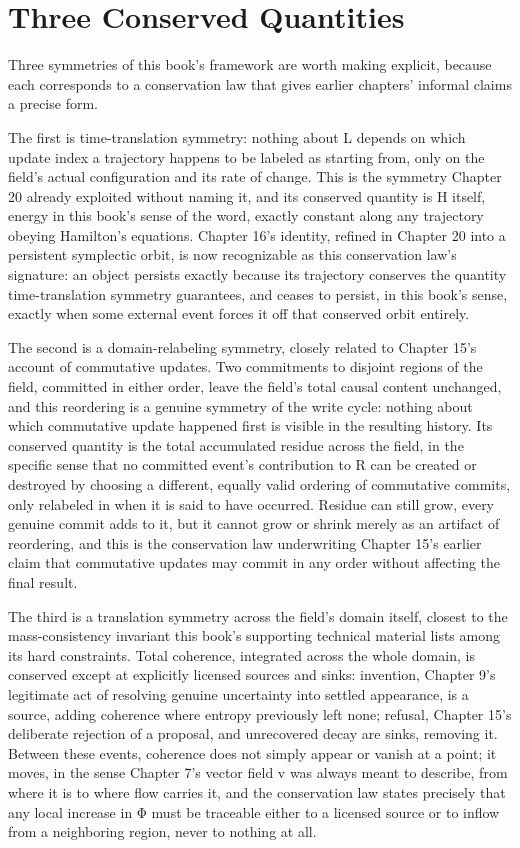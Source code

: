 \section{Three Conserved Quantities}

Three symmetries of this book's framework are worth making explicit, because each corresponds to a conservation law that gives earlier chapters' informal claims a precise form.

The first is time-translation symmetry: nothing about L depends on which update index a trajectory happens to be labeled as starting from, only on the field's actual configuration and its rate of change. This is the symmetry Chapter 20 already exploited without naming it, and its conserved quantity is H itself, energy in this book's sense of the word, exactly constant along any trajectory obeying Hamilton's equations. Chapter 16's identity, refined in Chapter 20 into a persistent symplectic orbit, is now recognizable as this conservation law's signature: an object persists exactly because its trajectory conserves the quantity time-translation symmetry guarantees, and ceases to persist, in this book's sense, exactly when some external event forces it off that conserved orbit entirely.

The second is a domain-relabeling symmetry, closely related to Chapter 15's account of commutative updates. Two commitments to disjoint regions of the field, committed in either order, leave the field's total causal content unchanged, and this reordering is a genuine symmetry of the write cycle: nothing about which commutative update happened first is visible in the resulting history. Its conserved quantity is the total accumulated residue across the field, in the specific sense that no committed event's contribution to R can be created or destroyed by choosing a different, equally valid ordering of commutative commits, only relabeled in when it is said to have occurred. Residue can still grow, every genuine commit adds to it, but it cannot grow or shrink merely as an artifact of reordering, and this is the conservation law underwriting Chapter 15's earlier claim that commutative updates may commit in any order without affecting the final result.

The third is a translation symmetry across the field's domain itself, closest to the mass-consistency invariant this book's supporting technical material lists among its hard constraints. Total coherence, integrated across the whole domain, is conserved except at explicitly licensed sources and sinks: invention, Chapter 9's legitimate act of resolving genuine uncertainty into settled appearance, is a source, adding coherence where entropy previously left none; refusal, Chapter 15's deliberate rejection of a proposal, and unrecovered decay are sinks, removing it. Between these events, coherence does not simply appear or vanish at a point; it moves, in the sense Chapter 7's vector field v was always meant to describe, from where it is to where flow carries it, and the conservation law states precisely that any local increase in Φ must be traceable either to a licensed source or to inflow from a neighboring region, never to nothing at all.

